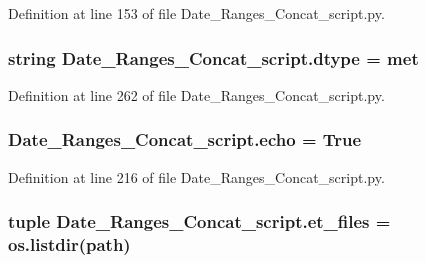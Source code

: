 Definition at line 153 of file Date\+\_\+\+Ranges\+\_\+\+Concat\+\_\+script.\+py.

\hypertarget{namespace_date___ranges___concat__script_a56177341fd21f8aeccbe4aec16af04a6}{}
\subsubsection[{dtype}]{\setlength{\rightskip}{0pt plus 5cm}string Date\+\_\+\+Ranges\+\_\+\+Concat\+\_\+script.\+dtype = \textquotesingle{}met\textquotesingle{}}\label{namespace_date___ranges___concat__script_a56177341fd21f8aeccbe4aec16af04a6}


Definition at line 262 of file Date\+\_\+\+Ranges\+\_\+\+Concat\+\_\+script.\+py.

\hypertarget{namespace_date___ranges___concat__script_a7e6380a9309908f90f8b0f73039f0798}{}
\subsubsection[{echo}]{\setlength{\rightskip}{0pt plus 5cm}Date\+\_\+\+Ranges\+\_\+\+Concat\+\_\+script.\+echo = True}\label{namespace_date___ranges___concat__script_a7e6380a9309908f90f8b0f73039f0798}


Definition at line 216 of file Date\+\_\+\+Ranges\+\_\+\+Concat\+\_\+script.\+py.

\hypertarget{namespace_date___ranges___concat__script_a475a3d107232b5bb9bd9a5ca10e92b7e}{}
\subsubsection[{et\+\_\+files}]{\setlength{\rightskip}{0pt plus 5cm}tuple Date\+\_\+\+Ranges\+\_\+\+Concat\+\_\+script.\+et\+\_\+files = os.\+listdir({\bf path})}\label{namespace_date___ranges___concat__script_a475a3d107232b5bb9bd9a5ca10e92b7e}


